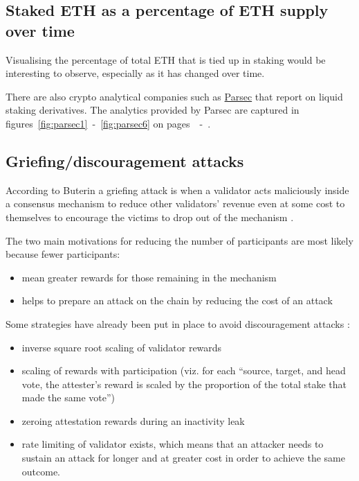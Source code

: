 \documentclass[UTF8]{article}
\begin{document}
{%
\subsection{Staked ETH as a percentage of ETH supply over time}
Visualising the percentage of total ETH that is tied up in staking would be interesting to observe, especially as it has changed over time.

There are also crypto analytical companies such as \href{https://parsec.finance/}{Parsec} that report on liquid staking derivatives. The analytics provided by Parsec are captured in figures~\ref{fig:parsec1}~-~\ref{fig:parsec6} on pages~\pageref{fig:parsec1}~-~\pageref{fig:parsec6}.

\subsection{Griefing/discouragement attacks}
According to Buterin a griefing attack is when a validator acts maliciously inside a consensus mechanism to reduce other validators' revenue even at some cost to themselves to encourage the victims to drop out of the mechanism \cite{Buterin2018c}.

The two main motivations for reducing the number of participants are most likely because fewer participants:
\begin{itemize}
\item mean greater rewards for those remaining in the mechanism
\item helps to prepare an attack on the chain by reducing the cost of an attack
\end{itemize}

Some strategies have already been put in place to avoid discouragement attacks \cite{Edgington2023}:
\begin{itemize}
\item inverse square root scaling of validator rewards
\item scaling of rewards with participation (viz. for each ``source, target, and head vote, the attester's reward is scaled by the proportion of the total stake that made the same vote'')
\item zeroing attestation rewards during an inactivity leak
\item rate limiting of validator exists, which means that an attacker needs to sustain an attack for longer and at greater cost in order to achieve the same outcome.
\end{itemize}

}
\end{document}
